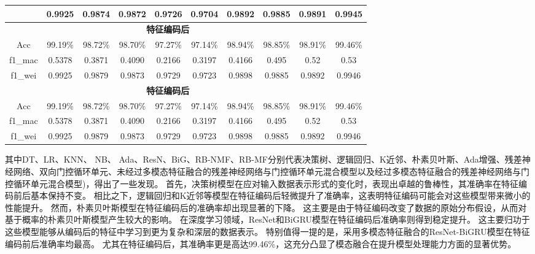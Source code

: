 \begin{table}[htbp]
\begin{tabular}{cccccccccc}
\begin{tabular}{cccccccccc}
		f1\_wei & 0.9925           & 0.9874          & 0.9872          & 0.9726         & 0.9704            & 0.9892          & 0.9885        & 0.9891          & 0.9945          \\
		\midrule
		\multicolumn{9}{c}{\textbf{特征编码后}}                                                                                                                                   \\
		Acc     & 99.19\%          & 98.72\%\uparrow & 98.70\%\uparrow & 97.27\%        & 97.14\%\downarrow & 98.94\%\uparrow & 98.85\%       & 98.91\%\uparrow & 99.46\%\uparrow \\
		f1\_mac & 0.5378\downarrow & 0.3871\uparrow  & 0.4090\uparrow  & 0.2166         & 0.3197\downarrow  & 0.4166\uparrow  & 0.495\uparrow & 0.52\uparrow    & 0.53\uparrow    \\
		f1\_wei & 0.9925           & 0.9879\uparrow  & 0.9873\uparrow  & 0.9729\uparrow & 0.9723\uparrow    & 0.9898\uparrow  & 0.9885        & 0.9892\uparrow  & 0.9946\uparrow  \\
		\multicolumn{9}{c}{\textbf{特征编码后}}                                                                                                                                   \\
		Acc     & 99.19\%          & 98.72\%\uparrow & 98.70\%\uparrow & 97.27\%        & 97.14\%\downarrow & 98.94\%\uparrow & 98.85\%       & 98.91\%\uparrow & 99.46\%\uparrow \\
		f1\_mac & 0.5378\downarrow & 0.3871\uparrow  & 0.4090\uparrow  & 0.2166         & 0.3197\downarrow  & 0.4166\uparrow  & 0.495\uparrow & 0.52\uparrow    & 0.53\uparrow    \\
		f1\_wei & 0.9925           & 0.9879\uparrow  & 0.9873\uparrow  & 0.9729\uparrow & 0.9723\uparrow    & 0.9898\uparrow  & 0.9885        & 0.9892\uparrow  & 0.9946\uparrow  \\
		\bottomrule
	\end{tabular}
\end{table}
其中DT、LR、KNN、 NB、 Ada、ResN、BiG、RB-NMF、RB-MF分别代表决策树、逻辑回归、K近邻、朴素贝叶斯、Ada增强、残差神经网络、双向门控循环单元、未经过多模态特征融合的残差神经网络与门控循环单元混合模型以及经过多模态特征融合的残差神经网络与门控循环单元混合模型)，得出了一些发现。
首先，决策树模型在应对输入数据表示形式的变化时，表现出卓越的鲁棒性，其准确率在特征编码前后基本保持不变。
相比之下，逻辑回归和K近邻等模型在特征编码后轻微提升了准确率，这表明特征编码可能会对这些模型带来微小的性能提升。
然而，朴素贝叶斯模型在特征编码后的准确率却出现显著的下降。
这主要是由于特征编码改变了数据的原始分布假设，从而对基于概率的朴素贝叶斯模型产生较大的影响。
在深度学习领域，ResNet和BiGRU模型在特征编码后准确率则得到稳定提升。
这主要归功于这些模型能够从编码后的特征中学习到更为复杂和深层的数据表示。
特别值得一提的是，采用多模态特征融合的ResNet-BiGRU模型在特征编码前后准确率均最高。
尤其在特征编码后，其准确率更是高达99.46\%，这充分凸显了模态融合在提升模型处理能力方面的显著优势。\par


